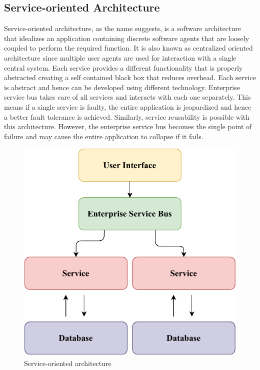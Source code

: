 \documentclass{home_assignment}
\begin{document}
\subsection{Service-oriented Architecture}
Service-oriented architecture, as the name suggests, is a software architecture that idealizes an application containing discrete software agents that are loosely coupled to perform the required function. It is also known as centralized oriented architecture since multiple user agents are used for interaction with a single central system. Each service provides a different functionality that is properly abstracted creating a self contained black box that reduces overhead. Each service is abstract and hence can be developed using different technology. Enterprise service bus takes care of all services and interacts with each one separately. This means if a single service is faulty, the entire application is jeopardized and hence a better fault tolerance is achieved. Similarly, service reusability is possible with this architecture. However, the enterprise service bus becomes the single point of failure and may cause the entire application to collapse if it fails.
\begin{figure}[H]
    \centering
    \includegraphics{../Figures/soa.pdf}
    \caption{Service-oriented architecture}
    \label{fig:soa}
\end{figure}
\end{document}
